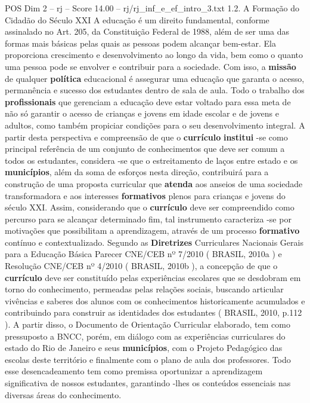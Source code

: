 \begin{textsample}{POS Dim 2 – rj – Score 14.00 – rj/rj\_inf\_e\_ef\_intro\_3.txt}  \label{ex:f2_pos_239}
1.2.
A Formação do Cidadão do Século XXI A educação é um direito fundamental, conforme assinalado no Art. 205, da Constituição Federal de 1988, além de ser uma das formas mais básicas pelas quais as pessoas podem alcançar bem-estar.
Ela proporciona crescimento e desenvolvimento ao longo da vida, bem como o quanto uma pessoa pode se envolver e contribuir para a sociedade.
Com isso, a \textbf{missão} de qualquer \textbf{política} educacional é assegurar uma educação que garanta o acesso, permanência e sucesso dos estudantes dentro de sala de aula.
Todo o trabalho dos \textbf{profissionais} que gerenciam a educação deve estar voltado para essa meta de não só garantir o acesso de crianças e jovens em idade escolar e de jovens e adultos, como também propiciar condições para o seu desenvolvimento integral.
A partir desta perspectiva e compreensão de que o \textbf{currículo} \textbf{institui} -se como principal referência de um conjunto de conhecimentos que deve ser comum a todos os estudantes, considera -se que o estreitamento de laços entre estado e os \textbf{municípios}, além da soma de esforços nesta direção, contribuirá para a construção de uma proposta curricular que \textbf{atenda} aos anseios de uma sociedade transformadora e aos interesses \textbf{formativos} plenos para crianças e jovens do século XXI.
Assim, considerando que o \textbf{currículo} deve ser compreendido como percurso para se alcançar determinado fim, tal instrumento caracteriza -se por motivações que possibilitam a aprendizagem, através de um processo \textbf{formativo} contínuo e contextualizado.
Segundo as \textbf{Diretrizes} Curriculares Nacionais Gerais para a Educação Básica Parecer CNE/CEB nº 7/2010 ( BRASIL, 2010a ) e Resolução CNE/CEB nº 4/2010 ( BRASIL, 2010b ), a concepção de que o \textbf{currículo} deve ser constituído pelas experiências escolares que se desdobram em torno do conhecimento, permeadas pelas relações sociais, buscando articular vivências e saberes dos alunos com os conhecimentos historicamente acumulados e contribuindo para construir as identidades dos estudantes ( BRASIL, 2010, p.112 ).
A partir disso, o Documento de Orientação Curricular elaborado, tem como pressuposto a BNCC, porém, em diálogo com as experiências curriculares do estado do Rio de Janeiro e seus \textbf{municípios}, com o Projeto Pedagógico das escolas deste território e finalmente com o plano de aula dos professores.
Todo esse desencadeamento tem como premissa oportunizar a aprendizagem significativa de nossos estudantes, garantindo -lhes os conteúdos essenciais nas diversas áreas do conhecimento.

\end{textsample}
